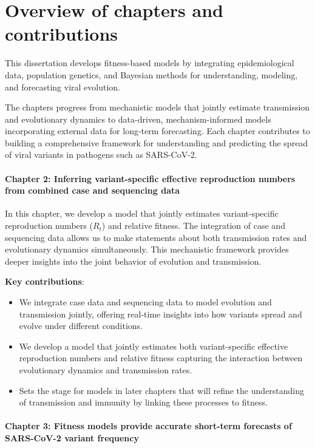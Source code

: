 \section{Overview of chapters and contributions}

This dissertation develops fitness-based models by integrating epidemiological data, population genetics, and Bayesian methods for understanding, modeling, and forecasting viral evolution. 

The chapters progress from mechanistic models that jointly estimate transmission and evolutionary dynamics to data-driven, mechanism-informed models incorporating external data for long-term forecasting. 
Each chapter contributes to building a comprehensive framework for understanding and predicting the spread of viral variants in pathogens such as SARS-CoV-2.

\paragraph{Chapter 2: Inferring variant-specific effective reproduction numbers from combined case and sequencing data}

In this chapter, we develop a model that jointly estimates variant-specific reproduction numbers ($R_t$) and relative fitness. The integration of case and sequencing data allows us to make statements about both transmission rates and evolutionary dynamics simultaneously. This mechanistic framework provides deeper insights into the joint behavior of evolution and transmission.

\noindent\textbf{Key contributions}:
\begin{itemize}
  \item We integrate case data and sequencing data to model evolution and transmission jointly, offering real-time insights into how variants spread and evolve under different conditions.
  \item We develop a model that jointly estimates both variant-specific effective reproduction numbers and relative fitness capturing the interaction between evolutionary dynamics and transmission rates.
  \item Sets the stage for models in later chapters that will refine the understanding of transmission and immunity by linking these processes to fitness.
\end{itemize}

\paragraph{Chapter 3: Fitness models provide accurate short-term forecasts of SARS-CoV-2 variant frequency}

